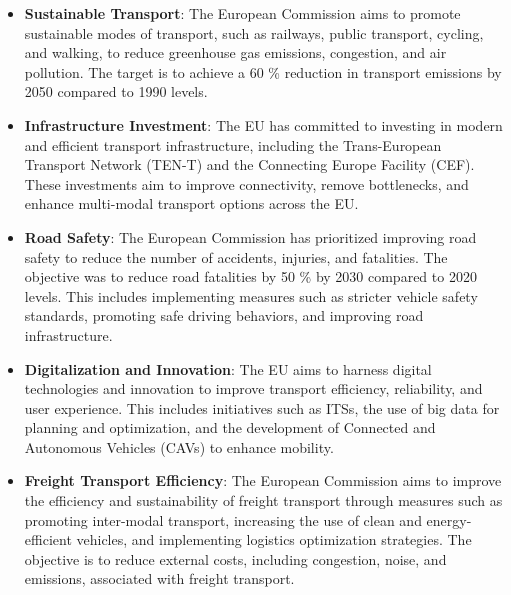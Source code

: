 \begin{itemize}
	
	\item \textbf{Sustainable Transport}: The European Commission aims to promote sustainable modes of transport, such as railways, public transport, cycling, and walking, to reduce greenhouse gas emissions, congestion, and air pollution. The target is to achieve a 60 \% reduction in transport emissions by 2050 compared to 1990 levels.
	
	\item \textbf{Infrastructure Investment}: The EU has committed to investing in modern and efficient transport infrastructure, including the Trans-European Transport Network (TEN-T) and the Connecting Europe Facility (CEF). These investments aim to improve connectivity, remove bottlenecks, and enhance multi-modal transport options across the EU.
	
	\item \textbf{Road Safety}: The European Commission has prioritized improving road safety to reduce the number of accidents, injuries, and fatalities. The objective was to reduce road fatalities by 50 \% by 2030 compared to 2020 levels. This includes implementing measures such as stricter vehicle safety standards, promoting safe driving behaviors, and improving road infrastructure.
	
	\item \textbf{Digitalization and Innovation}: The EU aims to harness digital technologies and innovation to improve transport efficiency, reliability, and user experience. This includes initiatives such as \acp{ITS}, the use of big data for planning and optimization, and the development of Connected and Autonomous Vehicles (CAVs) to enhance mobility.
	
	\item \textbf{Freight Transport Efficiency}: The European Commission aims to improve the efficiency and sustainability of freight transport through measures such as promoting inter-modal transport, increasing the use of clean and energy-efficient vehicles, and implementing logistics optimization strategies. The objective is to reduce external costs, including congestion, noise, and emissions, associated with freight transport.
	
\end{itemize}
 
